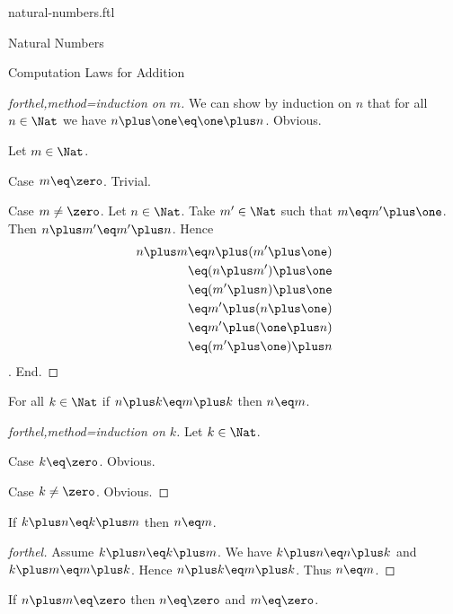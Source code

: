 \documentclass{naproche-library}
\begin{document}
\begin{smodule}{natural-numbers.ftl}
\begin{sfragment}{Natural Numbers}
\begin{sfragment}{Computation Laws for Addition}
\begin{proof}[forthel,method=induction on $m$]
      We can show by induction on $n$ that for all $n\in\Nat$ we have $n\plus\one\eq\one\plus n$.
      Obvious.

      Let $m\in\Nat$.

      Case $m\eq\zero$. Trivial.

      Case $m\neq\zero$.
        Let $n\in\Nat$.
        Take $m'\in\Nat$ such that $m\eq m'\plus\one$.
        Then $n\plus m'\eq m'\plus n$.
        Hence
        \begin{align*}
          n\plus m
            &\eq n\plus(m'\plus\one)\\
            &\eq (n\plus m')\plus\one\\
            &\eq (m'\plus n)\plus\one\\
            &\eq m'\plus(n\plus\one)\\
            &\eq m'\plus(\one\plus n)\\
            &\eq (m'\plus\one)\plus n
        \end{align*}.
      End.
    \end{proof}

    \begin{proposition}[forthel,title=Right cancellation,id=PlusIsRightCancellativeProp]
      For all $k\in\Nat$ if $n\plus k\eq m\plus k$ then $n\eq m$.
    \end{proposition}
    \begin{proof}[forthel,method=induction on $k$]
      Let $k\in\Nat$.

      Case $k\eq\zero$. Obvious.

      Case $k\neq\zero$. Obvious.
    \end{proof}

    \begin{corollary}[forthel,title=Left cancellation,id=PlusIsLeftCancellativeProp]
      If $k\plus n\eq k\plus m$ then $n\eq m$.
    \end{corollary}
    \begin{proof}[forthel]
      Assume $k\plus n\eq k\plus m$.
      We have $k\plus n\eq n\plus k$ and $k\plus m\eq m\plus k$.
      Hence $n\plus k\eq m\plus k$.
      Thus $n\eq m$.
    \end{proof}

    \begin{proposition}[forthel,id=ZeroSumImpliesZeroSummandsProp]
      If $n\plus m\eq\zero$ then $n\eq\zero$ and $m\eq\zero$.
    \end{proposition}
  \end{sfragment}
\end{sfragment}
\end{smodule}
\end{document}
